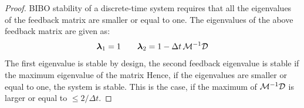 \begin{proof}

BIBO stability of a discrete-time system requires that all the eigenvalues of the feedback matrix are smaller or equal to one.
The eigenvalues of the above feedback matrix are given as:
\begin{equation}
	\boldsymbol{\lambda}_1 = 1 \qquad \boldsymbol{\lambda}_2 = 1 - \Delta t \, \mathcal{M}^{-1} \mathcal{D}
\end{equation}
The first eigenvalue is stable by design, the second feedback eigenvalue is stable if the maximum eigenvalue of the matrix 
Hence, if the eigenvalues are smaller or equal to one, the system is stable. This is the case, if the maximum of $\mathcal{M}^{-1} \mathcal{D}$ is larger or equal to $\leq 2 / \Delta t$.
\end{proof}


